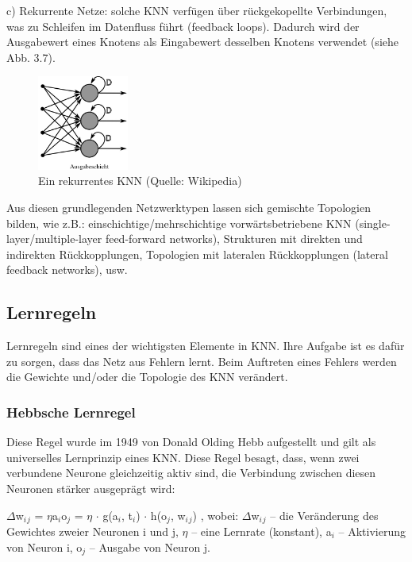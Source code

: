 c) Rekurrente Netze: solche KNN verfügen über rückgekopellte Verbindungen, was zu Schleifen im Datenfluss führt (feedback loops). Dadurch wird der Ausgabewert eines Knotens als Eingabewert desselben Knotens verwendet (siehe Abb. 3.7).

\begin{figure}[h]
\centering
\includegraphics[width=3cm]{chapters/neural_networks/recurrent.jpg}

\caption{Ein rekurrentes KNN (Quelle: Wikipedia)}
	\label{img:recurrent}

\end{figure}

Aus diesen grundlegenden Netzwerktypen lassen sich gemischte Topologien bilden, wie z.B.: einschichtige/mehrschichtige vorwärtsbetriebene KNN (single-layer/multiple-layer feed-forward networks), Strukturen mit direkten und indirekten Rückkopplungen, Topologien mit lateralen Rückkopplungen (lateral feedback networks), usw.

\subsection{Lernregeln}

Lernregeln sind eines der wichtigsten Elemente in KNN. Ihre Aufgabe ist es dafür zu sorgen, dass das Netz aus Fehlern lernt. Beim Auftreten eines Fehlers werden die Gewichte und/oder die Topologie des KNN verändert.

\subsubsection{Hebbsche Lernregel}

Diese Regel wurde im 1949 von Donald Olding Hebb aufgestellt und gilt als universelles Lernprinzip eines KNN. Diese Regel besagt, dass, wenn zwei verbundene Neurone gleichzeitig aktiv sind, die Verbindung zwischen diesen Neuronen stärker ausgeprägt wird:

$\Delta$w$_i$$_j$ = $\eta$a$_i$o$_j$ = $\eta$ $\cdot$ g(a$_i$, t$_i$) $\cdot$ h(o$_j$, w$_i$$_j$) ,
\newline
 wobei:  $\Delta$w$_i$$_j$ -- die Veränderung des Gewichtes zweier Neuronen i und j,  $\eta$ -- eine Lernrate (konstant), a$_i$ -- Aktivierung von Neuron i, o$_j$ -- Ausgabe von Neuron j.

